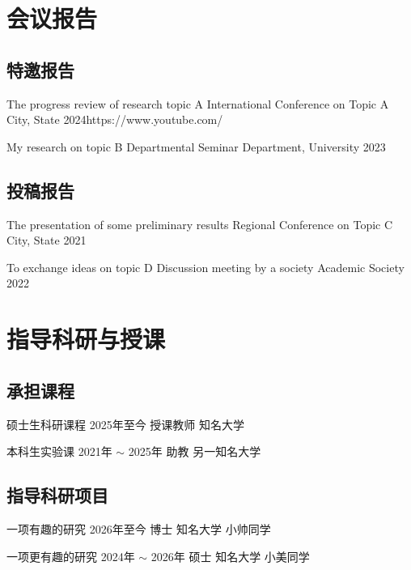 \documentclass[a4paper,11pt]{article}
\begin{document}
\section{会议报告}

\subsection{特邀报告}
\begin{prelist}
	\keynote
		{The progress review of research topic A}
		{International Conference on Topic A}
		{City, State}
		{2024}{https://www.youtube.com/}{}

	\guest
		{My research on topic B}
		{Departmental Seminar}
		{Department, University}
		{2023}{}{}
\end{prelist}

\subsection{投稿报告}
\begin{prelist}
	\oral
		{The presentation of some preliminary results}
		{Regional Conference on Topic C}
		{City, State}
		{2021}{}{}

	\poster
		{To exchange ideas on topic D}
		{Discussion meeting by a society}
		{Academic Society}
		{2022}{}{}

\end{prelist}

\section{指导科研与授课}

\subsection{承担课程}

\experience
	{硕士生科研课程}
	{2025年至今}
	{授课教师 知名大学}
	{}{}

\experience
	{本科生实验课}
	{2021年 $\sim$ 2025年}
	{助教 另一知名大学}
	{}{}

\subsection{指导科研项目}

\experience
	{一项有趣的研究}
	{2026年至今}
	{博士 知名大学}
	{小帅同学}
	{}

\experience
	{一项更有趣的研究}
	{2024年 $\sim$ 2026年}
	{硕士 知名大学}
	{小美同学}
	{}
\end{document}

